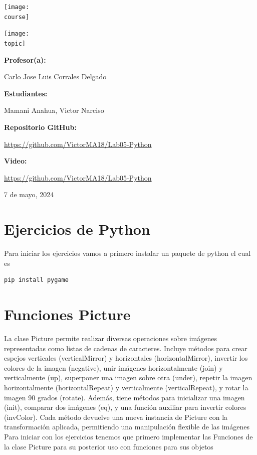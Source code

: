 \documentclass[10pt, a4paper]{article}
\newcommand{\course}{img/web_programming}
\newcommand{\topic}{img/Python.png}
\newcommand{\professor}{Carlo Jose Luis Corrales Delgado}
\newcommand{\students}{Mamani Anahua, Victor Narciso}
\newcommand{\github}{https://github.com/VictorMA18/Lab05-Python}
\newcommand{\video}{https://github.com/VictorMA18/Lab05-Python}
\newcommand{\mydate}{7 de mayo, 2024}
\begin{document}
\begin{titlepage}
	\centering
	\texttt{[image: \\course]} \par
  \vfill \vfill
	\texttt{[image: \\topic]}\par
  \vfill \vfill
  {\textbf{Profesor(a):} \par}
	\professor \vfill
  {\textbf{Estudiantes:} \par}
	\students \vfill
  {\textbf{Repositorio GitHub:} \par}
  \href{\github}{\github} \vfill
  {\textbf{Video:} \par}
  \href{\video}{\video} \vfill
	{\large \mydate \par}
\end{titlepage}

\section{Ejercicios de Python}
Para iniciar los ejercicios vamos a primero instalar un paquete de python el cual es 
\begin{lstlisting}[language=bash]
  pip install pygame
\end{lstlisting} 

\section{Funciones Picture}
La clase Picture permite realizar diversas operaciones sobre imágenes representadas como listas de cadenas de caracteres. Incluye métodos para crear espejos verticales (verticalMirror) y horizontales (horizontalMirror), invertir los colores de la imagen (negative), unir imágenes horizontalmente (join) y verticalmente (up), superponer una imagen sobre otra (under), repetir la imagen horizontalmente (horizontalRepeat) y verticalmente (verticalRepeat), y rotar la imagen 90 grados (rotate). Además, tiene métodos para inicializar una imagen (init), comparar dos imágenes (eq), y una función auxiliar para invertir colores (invColor). Cada método devuelve una nueva instancia de Picture con la transformación aplicada, permitiendo una manipulación flexible de las imágenes
\singlespacing
Para iniciar con los ejercicios tenemos que primero implementar las Funciones de la clase Picture para su posterior uso con funciones para sus objetos
\end{document}
